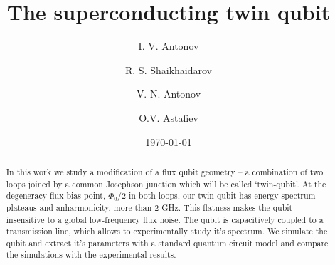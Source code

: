 \documentclass[%
reprint,
superscriptaddress,
bibnotes,
amsmath,
amssymb,
aps,
showkeys,
prb,
]{revtex4-1}
\begin{document}

\title{The superconducting twin qubit}

\author{I.  V.  Antonov}   

\author{R. S.  Shaikhaidarov} 

\author{V.  N.  Antonov}   

\author{O.V.  Astafiev}   

\date{\today}%

\begin{abstract}
  In this work  we study a modification of  a flux qubit geometry --  a combination of
  two loops joined by a common Josephson  junction which will be called `twin-qubit'.  At the degeneracy flux-bias point, $ \Phi_0/2 $ in both loops, our twin qubit has energy
  spectrum plateaus and anharmonicity, more than 2 GHz. This flatness makes the qubit insensitive to
  a global  low-frequency flux  noise.  The  qubit is capacitively  coupled to  a transmission
  line, which  allows to experimentally  study it's  spectrum.
  We simulate the qubit and extract it's parameters with a standard quantum circuit model and compare the simulations with the experimental results.
\end{abstract}


\maketitle
\end{document}
